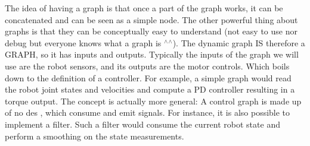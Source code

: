 The idea of having a graph is that once a part of the graph works, it can be concatenated and can be seen as a simple node. The other powerful thing about graphs is that they can be conceptually easy to understand (not easy to use nor debug but everyone knows what a graph is $^\wedge$$^\wedge$). The dynamic graph IS therefore a G\+R\+A\+PH, so it has inputs and outputs. Typically the inputs of the graph we will use are the robot sensors, and its outputs are the motor controls. Which boils down to the definition of a controller. For example, a simple graph would read the robot joint states and velocities and compute a PD controller resulting in a torque output. The concept is actually more general\+: A control graph is made up of no des , which consume and emit signals. For instance, it is also possible to implement a filter. Such a filter would consume the current robot state and perform a smoothing on the state measurements.

